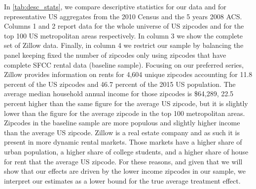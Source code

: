 In \autoref{tab:desc_stats}, we compare descriptive statistics for our data and for representative 
US aggregates from the 2010 Census and the 5 years 2008 ACS. Columns 1 and 2 report data for the 
whole universe of US zipcodes and for the top 100 US metropolitan areas respectively. In column 3 
we show the complete set of Zillow data. Finally, in column 4 we restrict our sample by balancing 
the panel keeping fixed the number of zipcodes only using zipcodes that have complete SFCC rental 
data (baseline sample). Focusing on our preferred series, Zillow provides information on rents for 
4,604 unique zipcodes accounting for 11.8 percent of the US zipcodes and 46.7 percent of the 2015 US population. 
The average median household annual income for those zipcodes is \$64,289, 22.5 percent higher than 
the same figure for the average US zipcode, but it is slightly lower than the figure for the average 
zipcode in the top 100 metropolitan areas. Zipcodes in the baseline sample are more populous and 
slightly higher income than the average US zipcode. Zillow is a real estate company and as such it 
is present in more dynamic rental markets. Those markets have a higher share of urban population, a 
higher share of college students, and a higher share of house for rent that the average US zipcode. 
For these reasons, and given that we will show that our effects are driven by the lower income 
zipcodes in our sample, we interpret our estimates as a lower bound for the true average treatment 
effect.


